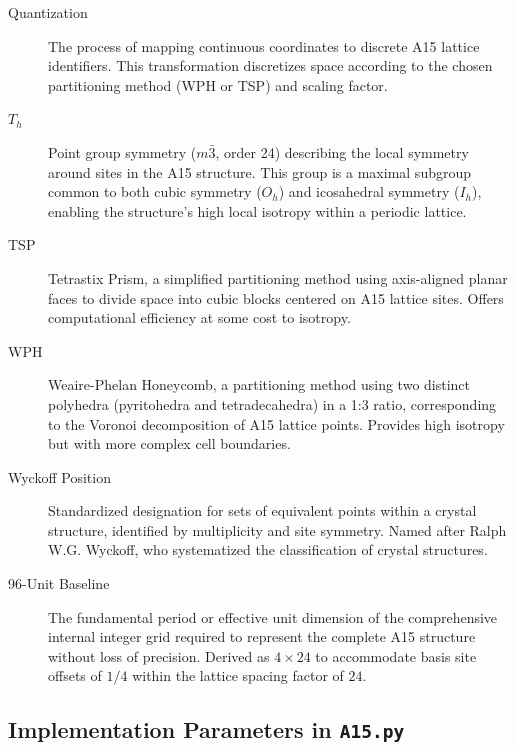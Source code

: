 \documentclass[10pt]{article}
\begin{document}
\begin{description}
    \item[Quantization] The process of mapping continuous coordinates to discrete A15 lattice identifiers. This transformation discretizes space according to the chosen partitioning method (WPH or TSP) and scaling factor.

    \item[$T_h$] Point group symmetry ($m\bar{3}$, order 24) describing the local symmetry around sites in the A15 structure. This group is a maximal subgroup common to both cubic symmetry ($O_h$) and icosahedral symmetry ($I_h$), enabling the structure's high local isotropy within a periodic lattice.

    \item[TSP] Tetrastix Prism, a simplified partitioning method using axis-aligned planar faces to divide space into cubic blocks centered on A15 lattice sites. Offers computational efficiency at some cost to isotropy.

    \item[WPH] Weaire-Phelan Honeycomb, a partitioning method using two distinct polyhedra (pyritohedra and tetradecahedra) in a 1:3 ratio, corresponding to the Voronoi decomposition of A15 lattice points. Provides high isotropy but with more complex cell boundaries.

    \item[Wyckoff Position] Standardized designation for sets of equivalent points within a crystal structure, identified by multiplicity and site symmetry. Named after Ralph W.G. Wyckoff, who systematized the classification of crystal structures.

    \item[96-Unit Baseline] The fundamental period or effective unit dimension of the comprehensive internal integer grid required to represent the complete A15 structure without loss of precision. Derived as $4 \times 24$ to accommodate basis site offsets of $1/4$ within the lattice spacing factor of $24$.
\end{description}

\subsection{Implementation Parameters in \texttt{A15.py}}
\label{subsec-glossary-params}
\end{document}
